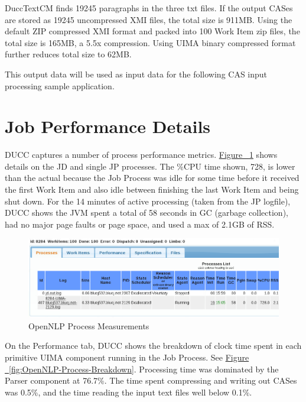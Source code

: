 DuccTextCM finds 19245 paragraphs in the three txt files. If the output CASes are stored as 19245 uncompressed XMI files, the total size is 911MB. Using the default ZIP compressed XMI format and packed into 100 Work Item zip files, the total size is 165MB, a 5.5x compression. Using UIMA binary compressed format further reduces total size to 62MB.

This output data will be used as input data for the following CAS input processing sample application.

\section{Job Performance Details}
DUCC captures a number of process performance metrics.
\hyperref[fig:OpenNLP-Process-Measurements]{Figure ~\ref{fig:OpenNLP-Process-Measurements}} shows details on the JD and 
single JP processes. The \%CPU time shown, 728, is lower than the actual because the Job Process was idle 
for some time before it received the first Work Item and also idle between finishing the last Work Item and being shut down.
For the 14 minutes of active processing (taken from the JP logfile), DUCC shows the JVM spent a total of 58 seconds in 
GC (garbage collection), had no major page faults or page space, and used a max of 2.1GB of RSS.

\begin{figure}[H]
  \centering
  \includegraphics[bb=0 0 947 299, width=7in]{images/BooksRaw.png}
  \caption{OpenNLP Process Measurements}
  \label{fig:OpenNLP-Process-Measurements}
\end{figure}

On the Performance tab, DUCC shows the breakdown of clock time spent in each primitive UIMA component running in the 
Job Process. See \hyperref[fig:OpenNLP-Process-Breakdown]{Figure ~\ref{fig:OpenNLP-Process-Breakdown}}.
Processing time was dominated by the Parser component at 76.7\%. The time spent compressing and writing out CASes 
was 0.5\%, and the time reading the input text files well below 0.1\%.

